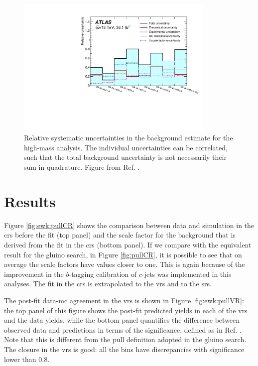 \begin{figure}[htbp]
	\centering
	\includegraphics[width=0.85\textwidth]{figures/ewk_prod/etmiss_misc/High-MET-syst.pdf}
	\caption{Relative systematic uncertainties in the background estimate for the high-mass analysis. The individual uncertainties can be correlated, such that the total background uncertainty is not necessarily their sum in quadrature. Figure from Ref. \cite{Aaboud:2018htj}. 
	} 
	\label{fig:syst_etmiss}
\end{figure}

\section{Results}
\label{sec:ewk:results}

Figure \ref{fig:ewk:pullCR} shows the comparison between data and simulation in the \glspl{cr} before the fit (top panel)
and the scale factor for the \ttbar background that is derived from the fit in the \glspl{cr} (bottom panel).
If we compare with the equivalent result for the gluino search, in Figure \ref{fig:pullCR}, it is possible 
to see that on average the \ttbar scale factors have values closer to one. 
This is again because of the improvement in the $b$-tagging calibration of $c$-jets was implemented in this analyses. 
The fit in the \glspl{cr} is extrapolated to the \glspl{vr} and to the \glspl{sr}. 

The post-fit data-\gls{mc} agreement in the \glspl{vr} is shown in Figure \ref{fig:ewk:pullVR}: the top panel of this figure 
shows the post-fit predicted yields in each of the \glspl{vr} and the data yields, while the bottom panel quantifies the 
difference between observed data and predictions in terms of the significance, defined as in Ref. \cite{Choudalakis:2011okv}. 
Note that this is different from the pull definition adopted in the gluino search. 
The closure in the \glspl{vr} is good: all the bins have discrepancies with significance lower than 0.8. 

